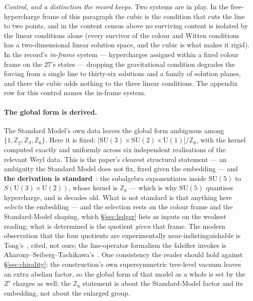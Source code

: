 \documentclass[11pt,a4paper]{article}
\theoremstyle{definition}
\theoremstyle{remark}
\newcommand{\Z}{\mathbb{Z}}
\begin{document}
\noindent\emph{Control, and a distinction the record keeps.} Two systems are in play. In the free-hypercharge frame of this paragraph the cubic is the condition that cuts the line to two points, and in the content census above no surviving content is isolated by the linear conditions alone (every survivor of the colour and Witten conditions has a two-dimensional linear solution space, and the cubic is what makes it rigid). In the record's \emph{in-frame} system --- hypercharges assigned within a fixed colour frame on the $27$'s states --- dropping the gravitational condition degrades the forcing from a single line to thirty-six solutions and a family of solution planes, and there the cubic adds nothing to the three linear conditions. The appendix row for this control names the in-frame system.

\paragraph{The global form is derived.} The Standard Model's own data leaves the global form ambiguous
among $\{1,\Z_2,\Z_3,\Z_6\}$. Here it is fixed:
$\bigl[\mathrm{SU}(3)\times\mathrm{SU}(2)\times\mathrm{U}(1)\bigr]/\Z_6$, with the kernel computed
exactly and uniformly across six independent realisations of the relevant Weyl data. This is the paper's clearest structural statement --- an ambiguity the Standard Model does not fix, fixed given the
embedding --- and \textbf{the derivation is standard}~\cite{hucks}: the subalgebra exponentiates inside $\mathrm{SU}(5)$ to
$S(\mathrm{U}(3)\times\mathrm{U}(2))$, whose kernel is $\Z_6$ --- which is why $\mathrm{SU}(5)$
quantises hypercharge, and is decades old. What is not standard is that anything here \emph{selects} the
embedding --- and the selection rests on the colour frame and the Standard-Model shaping, which
\S\ref{sec:ledger} lists as inputs on the weakest reading; what is determined is the quotient \emph{given} that frame. The modern observation that the four quotients are experimentally near-indistinguish\-able
is Tong's~\cite{tong}, cited, not ours; the line-operator formalism the falsifier invokes is Aharony--Seiberg--Tachikawa's~\cite{ast}.
One consistency the reader should hold against \S\ref{sec:chirality}: the construction's own supersymmetric tree-level vacuum
leaves an extra abelian factor, so the global form of that model as a whole is set by the $Z'$ charges as well; the $\Z_6$
statement is about the Standard-Model factor and its embedding, not about the enlarged group.
\end{document}
